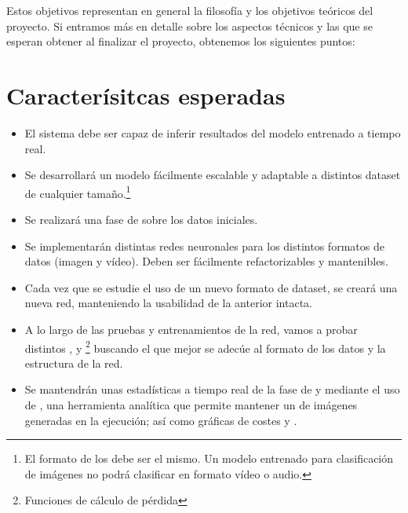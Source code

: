 Estos objetivos representan en general la filosofía y los objetivos teóricos del proyecto. Si entramos más en detalle sobre los aspectos técnicos y las  que se esperan obtener al finalizar el proyecto, obtenemos los siguientes puntos:

\section{Caracterísitcas esperadas}

\begin{itemize}
  \item El sistema debe ser capaz de inferir resultados del modelo entrenado a tiempo real.
  \item Se desarrollará un modelo fácilmente escalable y adaptable a distintos dataset de cualquier tamaño.\footnote{El formato de los  debe ser el mismo. Un modelo entrenado para clasificación de imágenes no podrá clasificar en formato vídeo o audio.}
  \item Se realizará una fase de  sobre los datos iniciales.
  \item Se implementarán distintas redes neuronales para los distintos formatos de datos (imagen y vídeo). Deben ser fácilmente refactorizables y mantenibles.
  \item Cada vez que se estudie el uso de un nuevo formato de dataset, se creará una nueva red, manteniendo la usabilidad de la anterior intacta.
  \item A lo largo de las pruebas y entrenamientos de la red, vamos a probar distintos ,  y \footnote{Funciones de cálculo de pérdida} buscando el que mejor se adecúe al formato de los datos y la estructura de la red.
  \item Se mantendrán unas estadísticas a tiempo real de la fase de  y  mediante el uso de , una herramienta analítica que permite mantener un  de imágenes generadas en la ejecución; así como gráficas de costes y .
\end{itemize}
